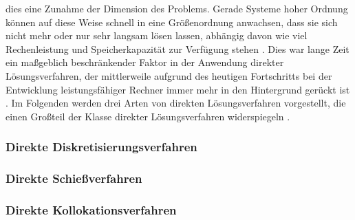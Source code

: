 dies eine Zunahme der Dimension des Problems. Gerade Systeme hoher Ordnung können auf diese Weise schnell in eine Größenordnung anwachsen, dass sie sich nicht mehr oder nur sehr langsam lösen lassen, abhängig davon wie viel Rechenleistung und Speicherkapazität zur Verfügung stehen \cite{Papageorgiou.2012}. Dies war lange Zeit ein maßgeblich beschränkender Faktor in der Anwendung direkter Lösungsverfahren, der mittlerweile aufgrund des heutigen Fortschritts bei der Entwicklung leistungsfähiger Rechner immer mehr in den Hintergrund gerückt ist \cite{Papageorgiou.2012}. Im Folgenden werden drei Arten von direkten Lösungsverfahren vorgestellt, die einen Großteil der Klasse direkter Lösungsverfahren widerspiegeln \cite{Papageorgiou.2012}. 
\subsubsection{Direkte Diskretisierungsverfahren}\label{subsubsec:Diskretisierungsverfahren_direkt}
\subsubsection{Direkte Schießverfahren}\label{subsubsec:Schießverfahren_direkt}
\subsubsection{Direkte Kollokationsverfahren}\label{subsubsec:Kollokationsverfahren_direkt}

